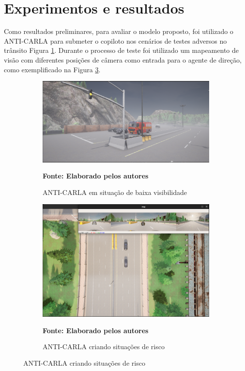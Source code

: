 \documentclass[a4paper,12pt,Times]{article}
\begin{document}
\section{Experimentos e resultados}
Como resultados preliminares, para avaliar o modelo proposto, foi utilizado o ANTI-CARLA para submeter o copiloto nos cenários de testes adversos no trânsito Figura \ref{fig:nevoa}. Durante o processo de teste foi utilizado um mapeamento de visão com diferentes posições de câmera como entrada para o agente de direção, como exemplificado na Figura \ref{fig:anti-carla}.


\begin{figure}[H]
\caption{Imagens ilustrativas do ANTI-CARLA}
\centering
\begin{subfigure}{0.45\textwidth}
    \centering
    \includegraphics[scale=0.13]{figuras/nevoa.png}
    \captionsetup{justification=centering}
    \caption{ANTI-CARLA em situação de baixa visibilidade}
    \label{fig:nevoa}
    \vspace{-0.2cm}
    \textbf{\footnotesize Fonte: Elaborado pelos autores}
\end{subfigure}
\hfill
\begin{subfigure}{0.45\textwidth}
    \centering
    \includegraphics[scale=0.13]{figuras/Anti-carla.png}
    \captionsetup{justification=centering}
    \caption{ANTI-CARLA criando situações de risco}
    \label{fig:anti-carla}
    \vspace{-0.2cm}
    \textbf{\footnotesize Fonte: Elaborado pelos autores}
\end{subfigure}

\end{figure}
\end{document}

